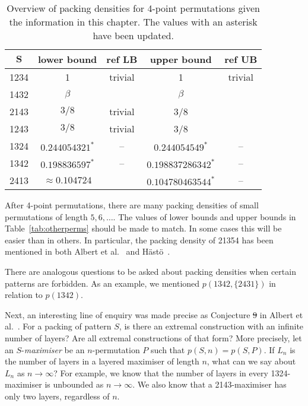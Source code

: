 \documentclass[12pt, a4paper, twoside]{report}
\providecommand{\DIFaddtex}[1]{{\protect\color{blue}\uwave{#1}}} %
\providecommand{\DIFdeltex}[1]{{\protect\color{red}\sout{#1}}}                      %
\providecommand{\DIFaddbegin}{} %
\providecommand{\DIFaddend}{} %
\providecommand{\DIFdelbegin}{} %
\providecommand{\DIFdelend}{} %
\providecommand{\DIFadd}[1]{\texorpdfstring{\DIFaddtex{#1}}{#1}} %
\providecommand{\DIFdel}[1]{\texorpdfstring{\DIFdeltex{#1}}{}} %
\begin{document}
\begin{table}[ht]
\centering
\begin{tabular}{|c | c | c | c | c|}
\hline
$\mathbf{S}$ & \textbf{lower bound} & \textbf{ref LB} & \textbf{upper bound} & \textbf{ref UB}\\
\hline\hline
1234 & 1 & trivial & 1 & trivial\\
\hline
1432 & $\beta$ & \cite{price1997packing} & $\beta$ & \cite{price1997packing}\\
\hline
2143 & $3/8$ & trivial & 3/8 & \cite{price1997packing}\\
\hline
1243 & $3/8$ & trivial & 3/8 & \cite{albert2002packing}\\
\hline
1324 & $0.244054321^*$ & -- & $0.244054549^*$ & -- \\
\hline
1342 & $0.198836597^*$ & --  & $0.198837286342^*$ & -- \\
\hline
2413 & $\approx 0.104724$ & \cite{presutti2010packing} & $0.104780463544^*$ & -- \\
\hline
\end{tabular}
\caption{\small{Overview of packing densities for 4-point permutations given the information in this chapter. The values with an asterisk have been updated.}}
\label{tab:updated}
\end{table}

After 4-point permutations, there are many packing densities of small permutations of length $5, 6,\ldots$. The values of lower bounds and upper bounds in Table~\ref{tab:otherperms} should be made to match. In some cases this will be easier than in others. In particular, the packing density of 21354 has been mentioned in both Albert et al.~\cite{albert2002packing} and H\"{a}st\"{o}~\cite{hasto2002packing}.

There are analogous questions to be asked about packing densities when certain patterns are forbidden. As an example, we mentioned $p(1342,\{2431\})$ in relation to $p(1342)$. 

Next, an interesting line of enquiry was made precise as Conjecture \DIFdelbegin \DIFdel{9 }\DIFdelend \DIFaddbegin \DIFadd{2.9 }\DIFaddend in Albert et al.~\cite{albert2002packing}. For a packing of pattern $S$, is there an extremal construction with an infinite number of layers? Are all extremal constructions of that form? More precisely, let an $S$-\emph{maximiser} be an $n$-permutation $P$ such that $p(S,n) = p(S,P)$. If $L_n$ is the number of layers in a layered maximiser of length $n$, what can we say about $L_n$ as $n\to\infty$? For example, we know that the number of layers in every 1324-maximiser is unbounded as $n \to \infty$. We also know that a 2143-maximiser has only two layers, regardless of $n$.
\end{document}
